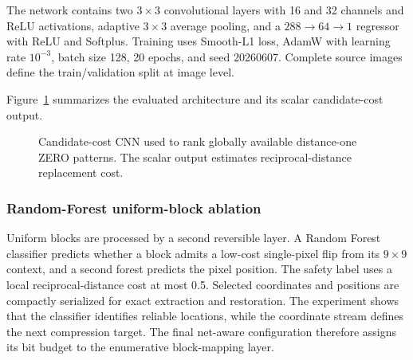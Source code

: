 \documentclass[a4paper,fleqn]{cas-dc}
\newcommand{\RevisionAddBegin}{\begingroup}
\newcommand{\RevisionAddEnd}{\endgroup}
\newcommand{\RevisionAddBegin}{\begingroup\color{revisionblue}}
\newcommand{\RevisionAddEnd}{\endgroup}
\begin{document}
The network contains two $3\times3$ convolutional layers with 16 and 32
channels and ReLU activations, adaptive $3\times3$ average pooling, and a
$288\rightarrow64\rightarrow1$ regressor with ReLU and Softplus. Training uses
Smooth-L1 loss, AdamW with learning rate $10^{-3}$, batch size 128, 20 epochs,
\RevisionAddBegin
and seed 20260607. Complete source images define the train/validation split at
image level.
\RevisionAddEnd

Figure~\ref{fig:cnn-architecture} summarizes the evaluated architecture and
its scalar candidate-cost output.

\begin{figure}[t]
\centering
{}
\caption{Candidate-cost CNN used to rank globally available distance-one ZERO
patterns. The scalar output estimates reciprocal-distance replacement cost.}
\label{fig:cnn-architecture}
\end{figure}

\subsubsection*{Random-Forest uniform-block ablation}
\label{subsec:rf-layer}

Uniform blocks are processed by a second reversible layer. A Random Forest
classifier predicts whether a block admits a low-cost single-pixel flip from
its $9\times9$ context, and a second forest predicts the pixel position. The
\RevisionAddBegin
safety label uses a local reciprocal-distance cost at most 0.5.
\RevisionAddEnd
Selected coordinates and positions are compactly serialized for exact
extraction and restoration. The experiment shows that the classifier
identifies reliable locations, while the coordinate stream defines the next
compression target. The final net-aware configuration therefore assigns its
bit budget to the enumerative block-mapping layer.
\end{document}
